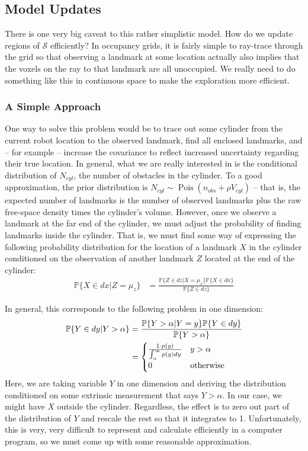 \documentclass[12pt]{article}
\DeclareMathOperator{\Pois}{Pois}
\begin{document}
\subsection{Model Updates}

There is one very big caveat to this rather simplistic model. How do we update regions of $\mathcal{S}$ efficiently? In occupancy grids, it is fairly simple to ray-trace through the grid so that observing a landmark at some location actually also implies that the voxels on the ray to that landmark are all unoccupied. We really need to do something like this in continuous space to make the exploration more efficient.

\subsubsection{A Simple Approach}

One way to solve this problem would be to trace out some cylinder from the current robot location to the observed landmark, find all enclosed landmarks, and -- for example -- increase the covariance to reflect increased uncertainty regarding their true location. In general, what we are really interested in is the conditional distribution of $N_{cyl}$, the number of obstacles in the cylinder. To a good approximation, the prior distribution is $N_{cyl} \sim \Pois(n_{obs} + \rho V_{cyl})$ -- that is, the expected number of landmarks is the number of observed landmarks plus the raw free-space density times the cylinder's volume. However, once we observe a landmark at the far end of the cylinder, we must adjust the probability of finding landmarks inside the cylinder. That is, we must find some way of expressing the following probability distribution for the location of a landmark $X$ in the cylinder conditioned on the observation of another landmark $Z$ located at the end of the cylinder:
\begin{align}
  \mathbb{P}\{X \in dx | Z = \mu_z\} &=
  \frac{\mathbb{P}\{Z \in dz | X = \mu_x\} \mathbb{P}\{X \in dx\}}{\mathbb{P}\{Z \in dz\}}
\end{align}

In general, this corresponds to the following problem in one dimension:
\begin{align}
  \mathbb{P}\{Y \in dy | Y > \alpha\} &=
  \frac{\mathbb{P}\{Y > \alpha | Y = y\} \mathbb{P}\{Y \in dy\}}{\mathbb{P}\{Y > \alpha\}} \\
  &= \begin{cases}
    \frac{1 \cdot p(y)}{\int_{\alpha}^{\infty} p(y) dy} & y > \alpha \\
    0 & \textnormal{otherwise}
  \end{cases}
\end{align}
Here, we are taking variable $Y$ in one dimension and deriving the distribution conditioned on some extrinsic measurement that says $Y > \alpha$. In our case, we might have $X$ outside the cylinder. Regardless, the effect is to zero out part of the distribution of $Y$ and rescale the rest so that it integrates to 1. Unfortunately, this is very, very difficult to represent and calculate efficiently in a computer program, so we must come up with some reasonable approximation.
\end{document}
